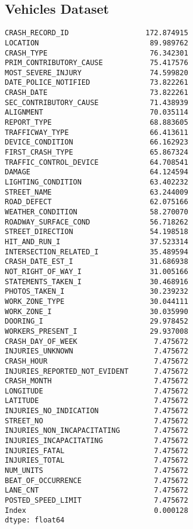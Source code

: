 \documentclass[12pt]{article}
\begin{document}
\subsection{Vehicles Dataset}
{\scriptsize
\begin{verbatim}
CRASH_RECORD_ID                  172.874915
LOCATION                          89.989762
CRASH_TYPE                        76.342301
PRIM_CONTRIBUTORY_CAUSE           75.417576
MOST_SEVERE_INJURY                74.599820
DATE_POLICE_NOTIFIED              73.822261
CRASH_DATE                        73.822261
SEC_CONTRIBUTORY_CAUSE            71.438939
ALIGNMENT                         70.035114
REPORT_TYPE                       68.883605
TRAFFICWAY_TYPE                   66.413611
DEVICE_CONDITION                  66.162923
FIRST_CRASH_TYPE                  65.867324
TRAFFIC_CONTROL_DEVICE            64.708541
DAMAGE                            64.124594
LIGHTING_CONDITION                63.402232
STREET_NAME                       63.244009
ROAD_DEFECT                       62.075166
WEATHER_CONDITION                 58.270070
ROADWAY_SURFACE_COND              56.718262
STREET_DIRECTION                  54.198518
HIT_AND_RUN_I                     37.523314
INTERSECTION_RELATED_I            35.489594
CRASH_DATE_EST_I                  31.686938
NOT_RIGHT_OF_WAY_I                31.005166
STATEMENTS_TAKEN_I                30.468916
PHOTOS_TAKEN_I                    30.239232
WORK_ZONE_TYPE                    30.044111
WORK_ZONE_I                       30.035990
DOORING_I                         29.978452
WORKERS_PRESENT_I                 29.937008
CRASH_DAY_OF_WEEK                  7.475672
INJURIES_UNKNOWN                   7.475672
CRASH_HOUR                         7.475672
INJURIES_REPORTED_NOT_EVIDENT      7.475672
CRASH_MONTH                        7.475672
LONGITUDE                          7.475672
LATITUDE                           7.475672
INJURIES_NO_INDICATION             7.475672
STREET_NO                          7.475672
INJURIES_NON_INCAPACITATING        7.475672
INJURIES_INCAPACITATING            7.475672
INJURIES_FATAL                     7.475672
INJURIES_TOTAL                     7.475672
NUM_UNITS                          7.475672
BEAT_OF_OCCURRENCE                 7.475672
LANE_CNT                           7.475672
POSTED_SPEED_LIMIT                 7.475672
Index                              0.000128
dtype: float64
\end{verbatim}}
\end{document}
